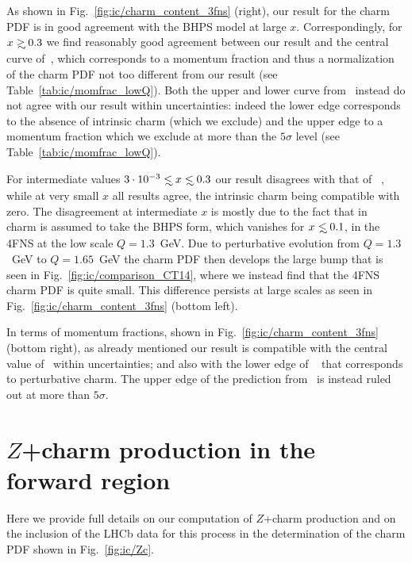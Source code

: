 As shown in Fig.~\ref{fig:ic/charm_content_3fns} (right), our result for
the charm PDF is in good agreement with the BHPS model at large
$x$. Correspondingly, for $x\gsim 0.3$
we find reasonably good agreement between our
result and the central curve of~\cite{Hou:2017khm}, which
corresponds to a momentum fraction and thus a normalization of the charm
PDF not too different from our result (see Table~\ref{tab:ic/momfrac_lowQ}).
%
Both the upper and lower curve from~\cite{Hou:2017khm} instead
do not agree with our result within uncertainties: indeed the
lower edge corresponds to the absence of intrinsic charm (which we
exclude) and the upper edge to a momentum fraction which we exclude
at more than the $5\sigma$ level (see Table~\ref{tab:ic/momfrac_lowQ}). 

For intermediate values $3\cdot10^{-3}\lsim x\lsim 0.3$  our result disagrees
with that of 
~\cite{Hou:2017khm}, while at very small $x$ all results agree,
the intrinsic charm being compatible with zero.
The disagreement at intermediate $x$ is mostly due
to the fact that in ~\cite{Hou:2017khm} charm is assumed to take
the BHPS form, which vanishes for $x\lsim 0.1$,
in the 4FNS at the low scale $Q=1.3$~GeV.
%
Due to perturbative evolution from  $Q=1.3$~GeV to $Q=1.65$~GeV the charm 
PDF then develops the large bump that is
seen in Fig.~\ref{fig:ic/comparison_CT14}, where we instead find that 
the 4FNS charm PDF is quite small.
%
This difference persists at large scales as seen  in
Fig.~\ref{fig:ic/charm_content_3fns} (bottom left).

In terms of momentum fractions, shown in Fig.~\ref{fig:ic/charm_content_3fns} (bottom right),
as already mentioned our result is
compatible with the central value of~\cite{Hou:2017khm} within
uncertainties; and also with the lower edge of ~\cite{Hou:2017khm}
that corresponds to perturbative charm.
%
The upper edge  of the prediction from~\cite{Hou:2017khm} is instead
ruled out at more than $5\sigma$. 

\clearpage
\section{$Z$+charm production in the forward region}
\label{sec:ic/zcharm}

Here we provide full details on our computation of  $Z$+charm
production and on the inclusion of the LHCb data for this
process in the determination of the charm PDF shown in
Fig.~\ref{fig:ic/Zc}. 


